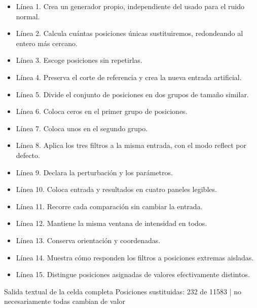 
\begin{itemize}

\item Línea 1. Crea un generador propio, independiente del usado para el ruido normal.

\item Línea 2. Calcula cuántas posiciones únicas sustituiremos, redondeando al entero más cercano.

\item Línea 3. Escoge posiciones sin repetirlas.

\item Línea 4. Preserva el corte de referencia y crea la nueva entrada artificial.

\item Línea 5. Divide el conjunto de posiciones en dos grupos de tamaño similar.

\item Línea 6. Coloca ceros en el primer grupo de posiciones.

\item Línea 7. Coloca unos en el segundo grupo.

\item Línea 8. Aplica los tres filtros a la misma entrada, con el modo reflect por defecto.

\item Línea 9. Declara la perturbación y los parámetros.

\item Línea 10. Coloca entrada y resultados en cuatro paneles legibles.

\item Línea 11. Recorre cada comparación sin cambiar la entrada.

\item Línea 12. Mantiene la misma ventana de intensidad en todos.

\item Línea 13. Conserva orientación y coordenadas.

\item Línea 14. Muestra cómo responden los filtros a posiciones extremas aisladas.

\item Línea 15. Distingue posiciones asignadas de valores efectivamente distintos.

\end{itemize}

\begin{Salida}{Salida textual de la celda completa}
Posiciones sustituidas: 232 de 11583 | no necesariamente todas cambian de valor
\end{Salida}

